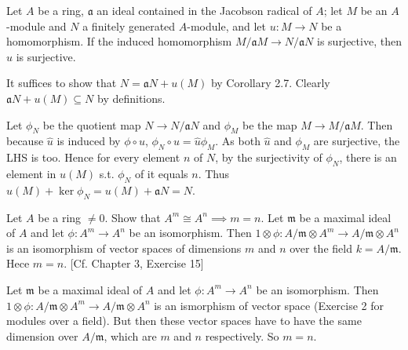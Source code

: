 \begin{questions}
	\question Let $A$ be a ring, $\mathfrak{a}$ an ideal contained in the Jacobson radical of $A $; let $M$ be an $A$-module and $N$ a finitely generated $A$-module, and let $u: M\to N$ be a homomorphism. If the induced homomorphism $M / \mathfrak{a}M \to N / \mathfrak{a}N$ is surjective, then $u$ is surjective.
	\begin{solution}
		It suffices to show that $N = \mathfrak{a}N + u(M)$ by Corollary 2.7.
		Clearly $\mathfrak{a}N + u(M) \subseteq N$ by definitions.

		Let $\phi_N$ be the quotient map $N\to N / \mathfrak{a}N$ and $\phi_M$ be the map $M \to M / \mathfrak{a}M$.
		Then because $\hat{u}$ is induced by $\phi \circ u $, $\phi_N \circ u = \hat{u}\phi_M$.
		As both $\hat{u}$ and $\phi _M$ are surjective, the LHS is too.
		Hence for every element $n$ of $N $, by the surjectivity of $\phi_N $, there is an element in $u(M)$ s.t. $\phi _N$ of it equals $n$.
		Thus $u(M) + \ker \phi _N = u(M) + \mathfrak{a}N = N$.
	\end{solution}

	\question Let $A$ be a ring $\ne 0$. Show that $A^m \cong A^n \implies m = n$.
	\ifhint
		Let $\mathfrak{m}$ be a maximal ideal of $A$ and let $\phi : A^m \to A^n$ be an isomorphism.
		Then $1 \otimes \phi: A / \mathfrak{m} \otimes A^m \to A / \mathfrak{m} \otimes A^n$ is an isomorphism of vector spaces of dimensions $m$ and $n$ over the field $k= A / \mathfrak{m}$.
		Hece $m=n$. [Cf. Chapter 3, Exercise 15]
	\fi
	\begin{solution}
		Let $\mathfrak{m}$ be a maximal ideal of $A$ and let $\phi : A^m \to A^n$ be an isomorphism.
		Then $1 \otimes \phi: A / \mathfrak{m} \otimes A^m \to A / \mathfrak{m} \otimes A^n$ is an ismorphism of vector space (Exercise 2 for modules over a field).
		But then these vector spaces have to have the same dimension over $A / \mathfrak{m} $, which are $m$ and $n$ respectively.
		So $m=n$.
	\end{solution}
\end{questions}
